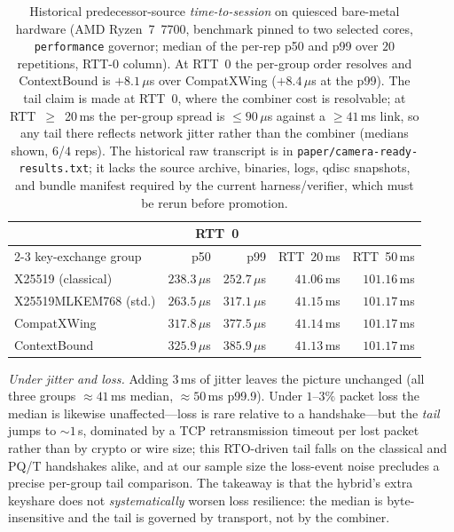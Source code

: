 \documentclass[journal]{IEEEtran}
\newcommand{\code}[1]{\texttt{\small #1}}
\begin{document}
\begin{table}[t]\centering\setlength{\tabcolsep}{4pt}
\caption{Historical predecessor-source \emph{time-to-session} on quiesced bare-metal hardware
(AMD Ryzen~7~7700,
benchmark pinned to two selected cores, \code{performance} governor; median of the per-rep p50 and
p99 over $20$ repetitions, RTT-0 column). At RTT~0 the per-group order resolves and ContextBound is
$+8.1\,\mu$s over CompatXWing ($+8.4\,\mu$s at the p99). The tail claim is made at RTT~0, where the
combiner cost is resolvable; at RTT~$\ge$~20\,ms the per-group spread is $\le 90\,\mu$s against a
$\ge 41$\,ms link, so any tail there reflects network jitter rather than the combiner (medians shown,
$6$/$4$ reps). The historical raw transcript is in
\code{paper/camera-ready-results.txt}; it lacks the source archive, binaries, logs, qdisc snapshots,
and bundle manifest required by the current harness/verifier, which must be rerun before promotion.}
\label{tab:baremetal}
\begin{tabular}{@{}l r r r r@{}}
\toprule
 & \multicolumn{2}{c}{RTT~0} & & \\
\cmidrule(lr){2-3}
key-exchange group & p50 & p99 & RTT~20\,ms & RTT~50\,ms \\
\midrule
X25519 (classical)                  & $238.3\,\mu$s & $252.7\,\mu$s & $41.06$\,ms & $101.16$\,ms \\
X25519MLKEM768 (std.) & $263.5\,\mu$s & $317.1\,\mu$s & $41.15$\,ms & $101.17$\,ms \\
CompatXWing & $317.8\,\mu$s & $377.5\,\mu$s & $41.14$\,ms & $101.17$\,ms \\
ContextBound & $325.9\,\mu$s & $385.9\,\mu$s & $41.13$\,ms & $101.17$\,ms \\
\bottomrule
\end{tabular}
\end{table}

\emph{Under jitter and loss.} Adding $3$\,ms of jitter leaves the picture unchanged (all three
groups $\approx 41$\,ms median, $\approx 50$\,ms p99.9). Under $1$--$3\%$ packet loss the median is
likewise unaffected---loss is rare relative to a handshake---but the \emph{tail} jumps to
$\sim 1$\,s, dominated by a TCP retransmission timeout per lost packet rather than by crypto or
wire size; this RTO-driven tail falls on the classical and PQ/T handshakes alike, and at our sample
size the loss-event noise precludes a precise per-group tail comparison. The takeaway is
that the hybrid's extra keyshare does not \emph{systematically} worsen loss resilience: the median
is byte-insensitive and the tail is governed by transport, not by the combiner.
\end{document}
